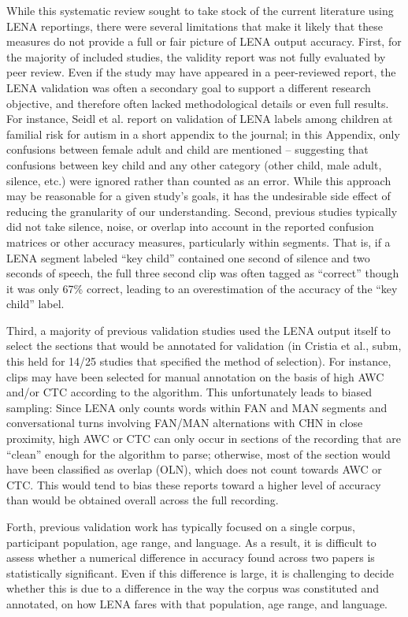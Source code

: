 \documentclass[english,floatsintext,man]{apa6}
\begin{document}
While this systematic review sought to take stock of the current
literature using LENA reportings, there were several limitations that
make it likely that these measures do not provide a full or fair picture
of LENA output accuracy. First, for the majority of included studies,
the validity report was not fully evaluated by peer review. Even if the
study may have appeared in a peer-reviewed report, the LENA validation
was often a secondary goal to support a different research objective,
and therefore often lacked methodological details or even full results.
For instance, Seidl et al. report on validation of LENA labels among
children at familial risk for autism in a short appendix to the journal;
in this Appendix, only confusions between female adult and child are
mentioned -- suggesting that confusions between key child and any other
category (other child, male adult, silence, etc.) were ignored rather
than counted as an error. While this approach may be reasonable for a
given study's goals, it has the undesirable side effect of reducing the
granularity of our understanding. Second, previous studies typically did
not take silence, noise, or overlap into account in the reported
confusion matrices or other accuracy measures, particularly within
segments. That is, if a LENA segment labeled \enquote{key child}
contained one second of silence and two seconds of speech, the full
three second clip was often tagged as \enquote{correct} though it was
only 67\% correct, leading to an overestimation of the accuracy of the
\enquote{key child} label.

Third, a majority of previous validation studies used the LENA output
itself to select the sections that would be annotated for validation (in
Cristia et al., subm, this held for 14/25 studies that specified the
method of selection). For instance, clips may have been selected for
manual annotation on the basis of high AWC and/or CTC according to the
algorithm. This unfortunately leads to biased sampling: Since LENA only
counts words within FAN and MAN segments and conversational turns
involving FAN/MAN alternations with CHN in close proximity, high AWC or
CTC can only occur in sections of the recording that are \enquote{clean}
enough for the algorithm to parse; otherwise, most of the section would
have been classified as overlap (OLN), which does not count towards AWC
or CTC. This would tend to bias these reports toward a higher level of
accuracy than would be obtained overall across the full recording.

Forth, previous validation work has typically focused on a single
corpus, participant population, age range, and language. As a result, it
is difficult to assess whether a numerical difference in accuracy found
across two papers is statistically significant. Even if this difference
is large, it is challenging to decide whether this is due to a
difference in the way the corpus was constituted and annotated, on how
LENA fares with that population, age range, and language.
\end{document}
